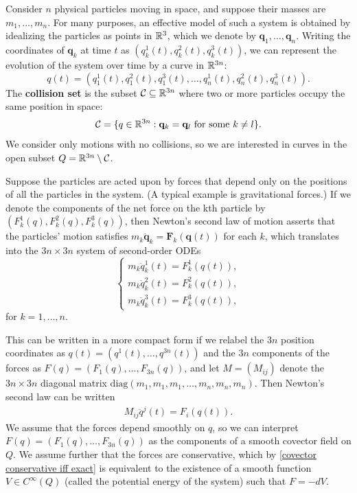 \begin{example}
Consider $n$ physical particles moving in space, and suppose their masses are $m_1,\dots,m_n$. For many purposes, an effective model of such a system is obtained by idealizing the particles as points in $\mathbb{R}^3$, which we denote by $\mathbf{q}_1,\dots,\mathbf{q}_n$. Writing the coordinates of $\mathbf{q}_k$ at time $t$ as $(q_k^1(t),q_k^2(t),q_k^3(t))$, we can represent the evolution of the system over time by a curve in $\mathbb{R}^{3n}$:
\[q(t)=(q_1^1(t),q_1^2(t),q_1^3(t),\dots,q_n^1(t),q_n^2(t),q_n^3(t)).\]
The \textbf{collision set} is the subset $\mathcal{C}\subseteq\mathbb{R}^{3n}$ where two or more particles occupy the same position in space:
\[\mathcal{C}=\{q\in\mathbb{R}^{3n}:\mathbf{q}_k=\mathbf{q}_l\text{ for some }k\neq l\}.\]
We consider only motions with no collisions, so we are interested in curves in the open subset $Q=\mathbb{R}^{3n}\setminus\mathcal{C}$.\par
Suppose the particles are acted upon by forces that depend only on the positions of all the particles in the system. (A typical example is gravitational forces.) If we denote the components of the net force on the kth particle by $(F_k^1(q),F_k^2(q),F_k^3(q))$, then Newton's second law of motion asserts that the particles' motion satisfies $m_k\ddot{\mathbf{q}}_k=\mathbf{F}_k(\mathbf{q}(t))$ for each $k$, which translates into the $3n\times 3n$ system of second-order ODEs
\begin{equation*}
\left\{
\begin{array}{l}
m_k\ddot{q}_k^1(t)=F_k^1(q(t)),\\[8pt]
m_k\ddot{q}_k^2(t)=F_k^2(q(t)),\\[8pt]
m_k\ddot{q}_k^3(t)=F_k^3(q(t)),
\end{array}
\right.
\end{equation*}
for $k=1,\dots,n$.\par
This can be written in a more compact form if we relabel the $3n$ position coordinates as $q(t)=(q^1(t),\dots,q^{3n}(t))$ and the $3n$ components of the forces as $F(q)=(F_1(q),\dots,F_{3n}(q))$, and let $M=(M_{ij})$ denote the $3n\times 3n$ diagonal matrix $\mathrm{diag}(m_1,m_1,m_1,\dots,m_n,m_n,m_n)$. Then Newton's second law can be written
\begin{align}\label{n-body problem-1}
M_{ij}\ddot{q}^j(t)=F_i(q(t)).
\end{align}
We assume that the forces depend smoothly on $q$, so we can interpret $F(q)=(F_1(q),\dots,F_{3n}(q))$ as the components of a smooth covector field on $Q$. We assume further that the forces are conservative, which by \cref{covector conservative iff exact} is equivalent to the existence of a smooth function $V\in C^\infty(Q)$ (called the potential energy of the system) such that $F=-dV$.\par

\end{example}
